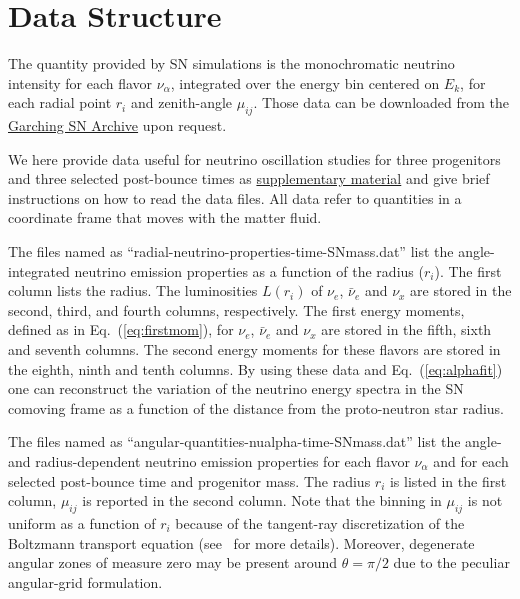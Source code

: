 \documentclass[iop,twocolappendix,numberedappendix]{emulateapj}
\begin{document}
\section{Data Structure} \label{sec:nudata}

 The quantity provided by SN simulations is the monochromatic
  neutrino intensity for each flavor $\nu_\alpha$, integrated over the
  energy bin centered on $E_k$, for each radial point $r_i$ and zenith-angle
  $\mu_{ij}$.  Those data can be downloaded from the
  \href{http://wwwmpa.mpa-garching.mpg.de/ccsnarchive/index.html}{Garching
    SN Archive} upon request.
    
    We here provide data useful for
neutrino oscillation studies for three progenitors and three selected
post-bounce times as
\href{http://wwwmpa.mpa-garching.mpg.de/ccsnarchive/data/Tamborra2017/}
     {supplementary material} and  give brief instructions on how
     to read the data files. All data refer to quantities in a
     coordinate frame that moves with the matter fluid.

The files named as ``radial-neutrino-properties-time-SNmass.dat'' list the
angle-integrated neutrino emission properties  as a function of the radius
($r_i$). The first column lists the radius. The luminosities $L(r_i)$ of
$\nu_e$, $\bar{\nu}_e$ and $\nu_x$ are stored in the second, third, and
 fourth columns, respectively. The first energy moments, defined as in
Eq.~(\ref{eq:firstmom}), for $\nu_e$, $\bar{\nu}_e$ and $\nu_x$ are stored in
the fifth, sixth and seventh columns. The second energy moments for these
flavors are stored in the eighth, ninth and tenth columns. By using these data
and Eq.~(\ref{eq:alphafit})  one can reconstruct the variation of the
neutrino energy spectra in the SN comoving frame as a function of the
distance from the proto-neutron star radius.



The files named as ``angular-quantities-nualpha-time-SNmass.dat'' list the
angle- and radius-dependent neutrino emission properties for each flavor
$\nu_\alpha$ and for each selected post-bounce time and progenitor mass. The
radius $r_i$ is listed in the first column, $\mu_{ij}$ is reported in the
second column. Note that the binning in $\mu_{ij}$ is not uniform as a function
of $r_i$ because of the tangent-ray discretization of the Boltzmann transport
equation (see~\cite{RamppJanka2002} for more details). Moreover, degenerate
angular zones of measure zero may be present around $\theta=\pi/2$ due to
the peculiar angular-grid formulation.
\end{document}
